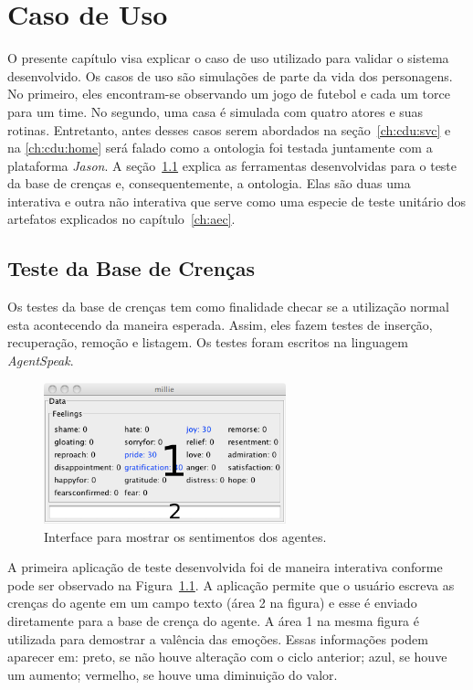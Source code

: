 \chapter{Caso de Uso} \label{ch:cdu}

O presente capítulo visa explicar o caso de uso utilizado para validar o
sistema desenvolvido. Os casos de uso são simulações de parte da vida dos
personagens. No primeiro, eles encontram-se observando um jogo de futebol e
cada um torce para um time. No segundo, uma casa é simulada com quatro atores
e suas rotinas. Entretanto, antes desses casos serem abordados na
seção~\ref{ch:cdu:svc} e na \ref{ch:cdu:home}
será falado como a ontologia foi testada juntamente com a plataforma
\emph{Jason}. A seção~\ref{ch:cdu:tbc} explica as ferramentas desenvolvidas
para o teste da base de crenças e, consequentemente, a ontologia. Elas são duas
uma interativa e outra não interativa que serve como uma especie de teste
unitário dos artefatos explicados no capítulo~\ref{ch:aec}.

\section{Teste da Base de Crenças} \label{ch:cdu:tbc}

Os testes da base de crenças tem como finalidade checar se a utilização normal
esta acontecendo da maneira esperada. Assim, eles fazem testes de inserção,
recuperação, remoção e listagem. Os testes foram escritos na linguagem
\emph{AgentSpeak}.

\begin{figure}
	\begin{center}
		\includegraphics[width=70mm]{figuras/introductionDF.png}
	\end{center}
	\caption{Interface para mostrar os sentimentos dos agentes.}
	\label{fig:introducaoDF}
\end{figure}

A primeira aplicação de teste desenvolvida foi de maneira interativa conforme
pode ser observado na Figura~\ref{fig:introducaoDF}. A aplicação permite que o
usuário escreva as crenças do agente em um campo texto (área 2 na figura) e
esse é enviado diretamente para a base de crença do agente. A área 1 na mesma
figura é utilizada para demostrar a valência das emoções.
Essas informações podem aparecer em: preto, se não houve alteração com o ciclo
anterior; azul, se houve um aumento; vermelho, se houve uma diminuição do
valor.

